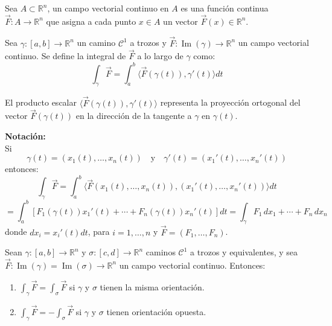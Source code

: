 \begin{definición} 
Sea $A \subset \mathbb{R}^n$, un campo vectorial continuo en $A$ es una función continua $\vec{F} : A \to \mathbb{R}^n$ que asigna a cada punto $x \in A$ un vector $\vec{F}(x) \in \mathbb{R}^n$.
\end{definición}
\begin{definición} 
Sea $\gamma : [a, b] \to \mathbb{R}^n$ un camino $\mathcal{C}^1$ a trozos y $\vec{F} : \operatorname{Im}(\gamma) \to \mathbb{R}^n$ un campo vectorial continuo. Se define la integral de $\vec{F}$ a lo largo de $\gamma$ como:
\[
    \int_\gamma \vec{F} = \int_a^b \langle \vec{F}(\gamma(t)), \gamma'(t) \rangle dt
\]
\end{definición}

\begin{observación}
El producto escalar $\langle \vec{F}(\gamma(t)), \gamma'(t) \rangle$ representa la proyección ortogonal del vector $\vec{F}(\gamma(t))$ en la dirección de la tangente a $\gamma \text{ en } \gamma(t)$.

\end{observación}

\textbf{Notación:}\\
Si
\[
    \gamma(t) = (x_1(t), \ldots, x_n(t)) \quad \text{y} \quad \gamma'(t) = (x_1'(t), \ldots, x_n'(t))
\]
entonces:
\[
    \int_\gamma \vec{F} = \int_a^b \langle \vec{F}(x_1(t), \ldots, x_n(t)), (x_1'(t), \ldots, x_n'(t)) \rangle dt
\]
\[
    = \int_a^b \left[ F_1(\gamma(t)) x_1'(t) + \cdots + F_n(\gamma(t)) x_n'(t) \right] dt = \int_\gamma F_1 \, dx_1 + \cdots + F_n \, dx_n
\]
donde $dx_i = x_i'(t) dt$, para $i = 1, \ldots, n$ y $\vec{F} = (F_1, \ldots,
    F_n)$.\\

\begin{teorema}
    Sean $\gamma : [a, b] \to \mathbb{R}^n$ y $\sigma : [c, d] \to \mathbb{R}^n$ caminos $\mathcal{C}^1$ a trozos y equivalentes, y sea $\vec{F} : \operatorname{Im}(\gamma) = \operatorname{Im}(\sigma) \to \mathbb{R}^n$ un campo vectorial continuo. Entonces:
    \vspace{-0.5em}
    \begin{enumerate}
        \item $\displaystyle \int_\gamma \vec{F} = \int_\sigma \vec{F}$ \quad si $\gamma$ y $\sigma$ tienen la misma orientación.
        \item $\displaystyle \int_\gamma \vec{F} = - \int_\sigma \vec{F}$ \quad si $\gamma$ y $\sigma$ tienen orientación opuesta.
    \end{enumerate}
\end{teorema}

